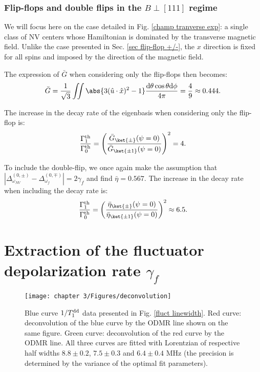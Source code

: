 \documentclass[a4paper, 11pt]{report}
\begin{document}
\subsection{Flip-flops and double flips in the $B\perp [111]$ regime}

We will focus here on the case detailed in Fig. \ref{champ tranverse exp}: a single class of NV centers whose Hamiltonian is dominated by the transverse magnetic field. Unlike the case presented in Sec. \ref{sec flip-flop +/-}, the $x$ direction is fixed for all spins and imposed by the direction of the magnetic field.

The expression of $\bar G$ when considering only the flip-flops then becomes:
\begin{equation}
\bar{G}= \frac{1}{\sqrt{3}}\iint \abs{3(\hat{u}\cdot\hat{x})^2 - 1} \frac{\rm d\theta \cos \theta \rm d\phi}{4 \pi}= \frac{4}{9}\approx 0.444.
\end{equation}

The increase in the decay rate of the eigenbasis when considering only the flip-flop is:
\begin{equation}
\frac{\Gamma_1^{\rm th}}{\Gamma_0^{\rm th}}=\left(\frac{\bar G_{\ket{\pm}}(\psi=0)}{\bar G_{\ket{\pm 1}}(\psi=0)}\right)^2=4.
\end{equation}

To include the double-flip, we once again make the assumption that $|\Delta_{\omega_{NV}}^{(0,\pm)}-\Delta_{\omega_{f}}^{(0,\mp)}|=2 \gamma_f$ and find $\bar \eta=0.567$. The increase in the decay rate when including the decay rate is:
\begin{equation}
\frac{\Gamma_1^{\rm th}}{\Gamma_0^{\rm th}}=\left(\frac{\bar \eta_{\ket{\pm}}(\psi=0)}{\bar \eta_{\ket{\pm 1}}(\psi=0)}\right)^2\approx 6.5.
\end{equation}

\chapter{Extraction of the fluctuator depolarization rate $\gamma_f$}

\label{Appendix fluct T1}
\begin{figure}[h]
\centering
\texttt{[image: chapter 3/Figures/deconvolution]}
\caption{Blue curve $1/T_1^{\rm dd}$ data presented in Fig. \ref{fluct linewidth}. Red curve: deconvolution of the blue curve by the ODMR line shown on the same figure. Green curve: deconvolution of the red curve by the ODMR line. All three curves are fitted with Lorentzian of respective half widths $8.8 \pm 0.2$, $7.5 \pm 0.3$ and $6.4 \pm 0.4$ MHz (the precision is determined by the variance of the optimal fit parameters).}
\label{deconvolution}
\end{figure}
\end{document}
